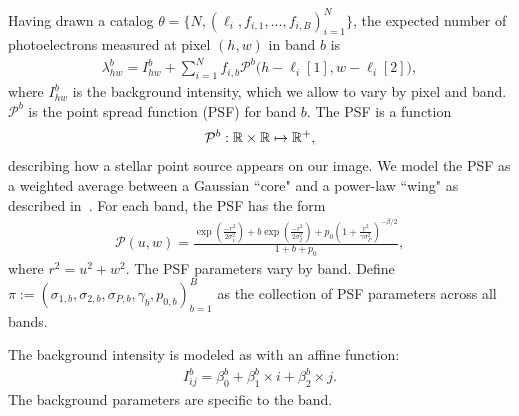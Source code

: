 


Having drawn a catalog $\theta = \{N, (\ell_i, f_{i,1}, ..., f_{i,B})_{i = 1}^N\}$,
the expected number of photoelectrons measured at pixel $(h,w)$ in band $b$ is
\begin{align}
  \lambda^b_{hw} = I^{b}_{hw} + \sum_{i = 1}^N f_{i,b} \mathcal{P}^b\big(h - \ell_{i}[1], w - \ell_{i}[2]\big),
  \label{eq:expected_intensity}
\end{align}
where $I^{b}_{hw}$ is the background intensity, which we allow to vary by pixel and band. $\mathcal{P}^b$ is the point spread function (PSF) for band $b$. The PSF
is a function 
\begin{align}
\mathcal{P}^b : \mathbb{R} \times \mathbb{R} \mapsto \mathbb{R}^+,
\end{align}
describing how a stellar point source appears
on our image. We model the PSF as a weighted average between a Gaussian ``core" and a power-law ``wing" as described in~\cite{Xin2018psf}. For each band, the PSF has the form
\begin{align}
    \mathcal{P}(u,w) = \frac{\exp(\frac{-r^2}{2\sigma_1^2}) + 
                            b \exp(\frac{-r^2}{2\sigma_2^2}) + 
                            p_0(1 + \frac{r^2}{\gamma\sigma^2_P})^{-\beta/2} }{1 + b + p_0},
\end{align}
where $r^2 = u^2 + w^2$. The PSF parameters vary by band. Define 
$\pi := (\sigma_{1,b}, \sigma_{2,b}, \sigma_{P,b}, \gamma_b, p_{0,b})_{b=1}^B$ as the collection of PSF parameters across all bands. 

The background intensity is modeled as with an affine function: 
\begin{align}
    I_{ij}^{b} = \beta_0^{b} + \beta_1^{b} \times i + \beta_2^{b} \times j.
\end{align}
The background parameters are specific to the band. 

